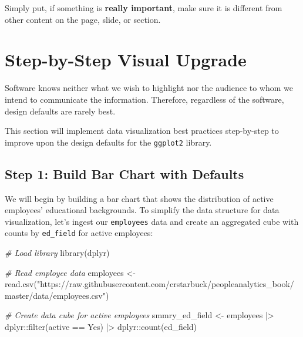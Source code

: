 \documentclass[
]{book}
\newenvironment{Shaded}{\begin{snugshade}}{\end{snugshade}}
\newcommand{\CommentTok}[1]{\textcolor[rgb]{0.56,0.35,0.01}{\textit{#1}}}
\newcommand{\FunctionTok}[1]{\textcolor[rgb]{0.00,0.00,0.00}{#1}}
\newcommand{\NormalTok}[1]{#1}
\newcommand{\OtherTok}[1]{\textcolor[rgb]{0.56,0.35,0.01}{#1}}
\newcommand{\SpecialCharTok}[1]{\textcolor[rgb]{0.00,0.00,0.00}{#1}}
\newcommand{\StringTok}[1]{\textcolor[rgb]{0.31,0.60,0.02}{#1}}
\begin{document}
Simply put, if something is \textbf{really important}, make sure it is different from other content on the page, slide, or section.

\hypertarget{step-by-step-visual-upgrade}{%
\section{Step-by-Step Visual Upgrade}\label{step-by-step-visual-upgrade}}

Software knows neither what we wish to highlight nor the audience to whom we intend to communicate the information. Therefore, regardless of the software, design defaults are rarely best.

This section will implement data visualization best practices step-by-step to improve upon the design defaults for the \texttt{ggplot2} library.

\hypertarget{step-1-build-bar-chart-with-defaults}{%
\subsection{Step 1: Build Bar Chart with Defaults}\label{step-1-build-bar-chart-with-defaults}}

We will begin by building a bar chart that shows the distribution of active employees' educational backgrounds. To simplify the data structure for data visualization, let's ingest our \texttt{employees} data and create an aggregated cube with counts by \texttt{ed\_field} for active employees:

\begin{Shaded}
\begin{Highlighting}[]
\CommentTok{\# Load library}
\FunctionTok{library}\NormalTok{(dplyr)}

\CommentTok{\# Read employee data}
\NormalTok{employees }\OtherTok{\textless{}{-}} \FunctionTok{read.csv}\NormalTok{(}\StringTok{"https://raw.githubusercontent.com/crstarbuck/peopleanalytics\_book/master/data/employees.csv"}\NormalTok{)}

\CommentTok{\# Create data cube for active employees}
\NormalTok{smmry\_ed\_field }\OtherTok{\textless{}{-}}\NormalTok{ employees }\SpecialCharTok{|\textgreater{}}
\NormalTok{                  dplyr}\SpecialCharTok{::}\FunctionTok{filter}\NormalTok{(active }\SpecialCharTok{==} \StringTok{\textquotesingle{}Yes\textquotesingle{}}\NormalTok{) }\SpecialCharTok{|\textgreater{}}
\NormalTok{                  dplyr}\SpecialCharTok{::}\FunctionTok{count}\NormalTok{(ed\_field)}
\end{Highlighting}
\end{Shaded}
\end{document}
